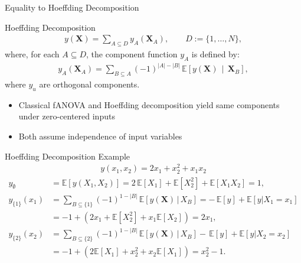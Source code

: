 \begin{frame}{Equality to Hoeffding Decomposition} %
  \begin{block}{Hoeffding Decomposition}
    \begin{align}
    y(\boldsymbol{X})
=
\sum_{A \subseteq D} 
y_A(\boldsymbol{X}_A),
\qquad
D := \{1,\dots,N\},
\end{align}
where, for each $A \subseteq D$, the component function $y_A$ is defined by:
\begin{align}\label{eq:hoeffding_components}
    y_A(\boldsymbol{X}_A)
=
\sum_{B \subseteq A}
(-1)^{|A|-|B|}
\,\mathbb{E}\!\left[
  y(\boldsymbol{X}) 
  \,\middle|\, 
  \boldsymbol{X}_B
\right],
\end{align}
  where $y_u$ are orthogonal components.
  \end{block}
  \begin{itemize}
    \item Classical fANOVA and Hoeffding decomposition yield same components under zero-centered inputs
    \item Both assume independence of input variables
  \end{itemize}
  
\end{frame}

\begin{frame}{Hoeffding Decomposition Example} %
  \begin{align*}
    y(x_1, x_2) = 2x_1 + x_2^{2} + x_1 x_2
  \end{align*}
  \begin{align*}
    y_{\emptyset}
    &= \mathbb{E}[y(X_1,X_2)] 
     = 2\,\mathbb{E}[X_1] + \mathbb{E}[X_2^2] + \mathbb{E}[X_1 X_2] 
     = 1,
    \\[1.2em]
    y_{\{1\}}(x_1)
    &= \sum_{B \subseteq \{1\}} (-1)^{1-|B|}
       \,\mathbb{E}[y(\boldsymbol{X})\,|\,X_B] = -\,\mathbb{E}[y] + \mathbb{E}[y|X_1=x_1] \\[2pt]
    &= -1 + (2x_1 + \mathbb{E}[X_2^2] + x_1\mathbb{E}[X_2]) = 2x_1,
    \\[1.2em]
    y_{\{2\}}(x_2)
    &= \sum_{B \subseteq \{2\}} (-1)^{1-|B|}
       \,\mathbb{E}[y(\boldsymbol{X})\,|\,X_B] -\,\mathbb{E}[y] + \mathbb{E}[y|X_2=x_2] \\[2pt]
    &= -1 + (2\mathbb{E}[X_1] + x_2^2 + x_2\mathbb{E}[X_1]) = x_2^2 - 1.
\end{align*}
\end{frame}

